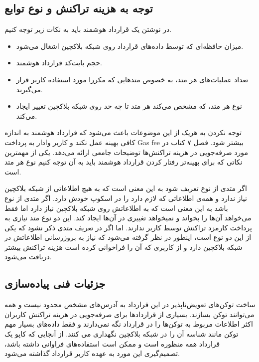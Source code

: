\subsection{توجه به هزینه تراکنش و نوع توابع}
در نوشتن یک قرارداد هوشمند باید به نکات زیر توجه کنیم.
\begin{itemize}
  \item
میزان حافظه‌ای که توسط داده‌های قرارداد روی شبکه بلاکچین اشغال می‌شود.
  \item
حجم بایت‌کد قرارداد هوشمند.
  \item
تعداد عملیات‌های هر متد، به خصوص متدهایی که مکررا مورد استفاده کاربر قرار می‌گیرند.
  \item
نوع هر متد، که مشخص می‌کند هر متد تا چه حد روی شبکه بلاکچین تغییر ایجاد می‌کند.
\end{itemize}

توجه نکردن به هریک از این موضوعات باعث می‌شود که قرارداد هوشمند به اندازه کافی بهینه عمل نکند و کاربر وادار به پرداخت
\gls{Gas fee}
بیشتر شود. فصل ۷ کتاب
\cite{MasteringEthereum}
در مورد صرفه‌جویی در هزینه تراکنش‌ها توضیحات جامعی ارائه می‌دهد.
یکی از مهمترین نکاتی که برای بهینه‌تر رفتار کردن قرارداد هوشمند
باید به آن توجه کنیم نوع هر متد است.

اگر متدی از نوع
تعریف شود به این معنی است که به هیچ اطلاعاتی از شبکه بلاکچین نیاز ندارد
و همه‌ی اطلاعاتی که لازم دارد را در اسکوپ
خودش دارد. اگر متدی از نوع
باشد به این معنی است که به اطلاعاتش روی شبکه بلاکچین نیاز دارد
اما فقط می‌خواهد آن‌ها را بخواند و نمیخواهد تغییری در آن‌ها ایجاد کند.
این دو نوع متد نیازی به پرداخت کارمزد تراکنش توسط کاربر ندارند.
اما اگر در تعریف متدی ذکر نشود که یکی از این دو نوع است، اینطور در نظر گرفته می‌شود
که نیاز به بروزرسانی اطلاعاتش در شبکه بلاکچین دارد
و از کاربری که آن را فراخوانی کرده است هزینه تراکنش بیشتر دریافت می‌شود.


\subsection{جزئیات فنی پیاده‌سازی}
ساخت توکن‌های تعویض‌ناپذیر در این قرارداد به آدرس‌های مشخص محدود نیست و همه می‌توانند توکن بسازند.
بسیاری از قراردادها برای صرفه‌جویی در هزینه تراکنش کاربران اکثر اطلاعات مربوط به توکن‌ها را در قرارداد نگه نمی‌دارند
و فقط داده‌های بسیار مهم توکن مانند شناسه آن را در شبکه بلاکچین نگهداری می کنند.
از آنجایی که کاپو یک قرارداد همه منظوره است و ممکن است استفاده‌های فراوانی داشته باشد،
تصمیم‌گیری این مورد به عهده کاربر قرارداد گذاشته می‌شود.

